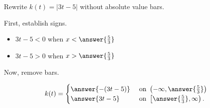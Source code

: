 \documentclass{ximera}
\author{Lee Wayand}
\begin{document}
\begin{example}











Rewrite $k(t) = | 3t - 5 |$ without absolute value bars.



\begin{explanation}


First, establish signs.

\begin{itemize}
\item $3t - 5 < 0$ when $x < \answer{\frac{5}{3}}$
\item $3t - 5 > 0$ when $x > \answer{\frac{5}{3}}$
\end{itemize}




Now, remove bars.

\[
k(t) = 
\begin{cases}
  \answer{-(3t - 5)} & \text{ on } \left( -\infty, \answer{\frac{5}{3}} \right)   \\
  \answer{3t - 5}  & \text{ on } \left[ \answer{\frac{5}{3}}, \infty \right).
\end{cases}
\]






\end{explanation}






\end{example}
\end{document}
